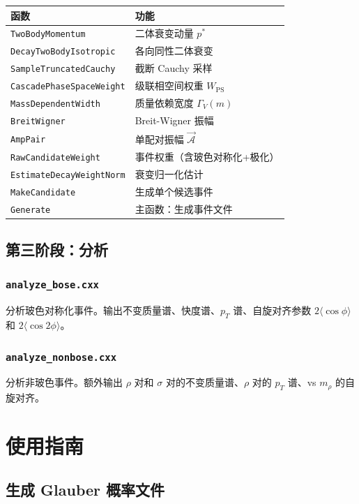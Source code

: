 \documentclass[11pt,a4paper,UTF8]{ctexart}
\begin{document}
\begin{longtable}{l p{8cm}}
\toprule
\textbf{函数} & \textbf{功能} \\
\midrule
\texttt{TwoBodyMomentum} & 二体衰变动量 $p^*$ \\
\texttt{DecayTwoBodyIsotropic} & 各向同性二体衰变 \\
\texttt{SampleTruncatedCauchy} & 截断 Cauchy 采样 \\
\texttt{CascadePhaseSpaceWeight} & 级联相空间权重 $W_{\text{PS}}$ \\
\texttt{MassDependentWidth} & 质量依赖宽度 $\Gamma_V(m)$ \\
\texttt{BreitWigner} & Breit-Wigner 振幅 \\
\texttt{AmpPair} & 单配对振幅 $\vec{\mathcal{A}}$ \\
\texttt{RawCandidateWeight} & 事件权重（含玻色对称化+极化） \\
\texttt{EstimateDecayWeightNorm} & 衰变归一化估计 \\
\texttt{MakeCandidate} & 生成单个候选事件 \\
\texttt{Generate} & 主函数：生成事件文件 \\
\bottomrule
\end{longtable}

\subsection{第三阶段：分析}

\subsubsection{\texttt{analyze\_bose.cxx}}

分析玻色对称化事件。输出不变质量谱、快度谱、$p_T$ 谱、自旋对齐参数 $2\langle\cos\phi\rangle$ 和 $2\langle\cos 2\phi\rangle$。

\subsubsection{\texttt{analyze\_nonbose.cxx}}

分析非玻色事件。额外输出 $\rho$ 对和 $\sigma$ 对的不变质量谱、$\rho$ 对的 $p_T$ 谱、vs $m_\rho$ 的自旋对齐。

\section{使用指南}

\subsection{生成 Glauber 概率文件}
\end{document}

